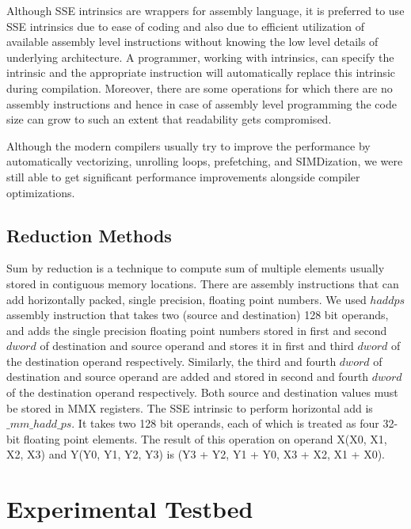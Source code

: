\documentclass{IEEEtran}
\begin{document}
Although SSE intrinsics are wrappers for assembly language, it is preferred to use SSE intrinsics due to ease of coding and also due to efficient utilization of available assembly level instructions without knowing the low level details of underlying architecture. A programmer, working with intrinsics, can specify the intrinsic and the appropriate instruction will automatically replace this intrinsic during compilation. Moreover, there are some operations for which there are no assembly instructions and hence in case of assembly level programming the code size can grow to such an extent that readability gets compromised.  

Although the modern compilers usually try to improve the performance by automatically vectorizing, unrolling loops, prefetching, and SIMDization, we were still able to get significant performance improvements alongside compiler optimizations.

\subsection{Reduction Methods}

\label{sub:reduction} Sum by reduction is a technique to compute sum of multiple elements usually stored in contiguous memory locations. There are assembly instructions that can add horizontally packed, single precision, floating point numbers. We used $haddps$ assembly instruction that takes two (source and destination) 128 bit operands, and adds the single precision floating point numbers stored in first and second $dword$ of destination and source operand and stores it in first and third $dword$ of the destination operand respectively. Similarly, the third and fourth $dword$ of destination and source operand are added and stored in second and fourth $dword$ of the destination operand respectively. Both source and destination values must be stored in MMX registers. The SSE intrinsic to perform horizontal add is $\_mm\_hadd\_ps$. It takes two 128 bit operands, each of which is treated as four 32-bit floating point elements. The result of this operation on operand X(X0, X1, X2, X3) and Y(Y0, Y1, Y2, Y3) is (Y3 + Y2, Y1 + Y0, X3 + X2, X1 + X0).

\section{Experimental Testbed}
\label{sec:expt}
\end{document}
